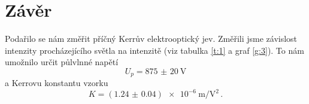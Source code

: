 \section*{Závěr}
Podařilo se nám změřit příčný Kerrův elektrooptický jev. Změřili jsme závislost intenzity procházejícího světla na intenzitě (viz tabulka \ref{t:1} a graf \ref{g:3}). To nám umožnilo určit půlvlnné napětí
\begin{equation*}
U_p=\SI{875(20)}{\volt}
\end{equation*}
a Kerrovu konstantu vzorku
\begin{equation*}
K = (\num{1.24(4)})\SI{e-6}{\metre\per\volt\squared} \,.
\end{equation*}